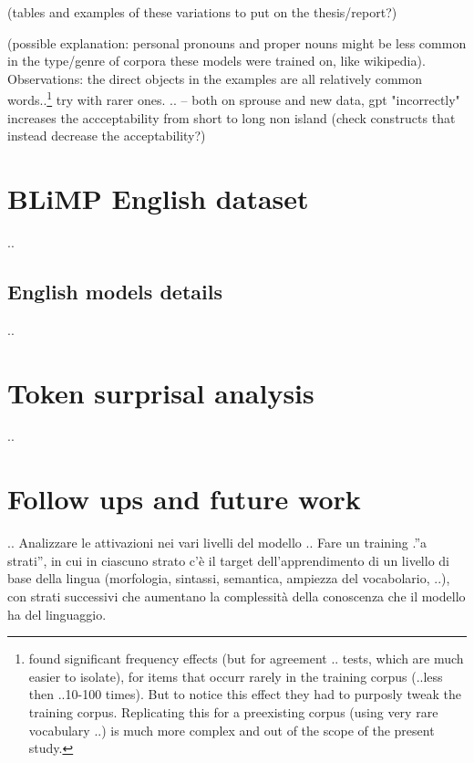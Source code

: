 (tables and examples of these variations to put on the thesis/report?)

(possible explanation: personal pronouns and proper nouns might be less common in the type/genre of corpora these models were trained on, like wikipedia).
Observations: the direct objects in the examples are all relatively common words..\footnote{\citet{wei2021frequency} found significant frequency effects (but for agreement .. tests, which are much easier to isolate), for items that occurr rarely in the training corpus (..less then ..10-100 times). But to notice this effect they had to purposly tweak the training corpus. Replicating this for a preexisting corpus (using very rare vocabulary ..) is much more complex and out of the scope of the present study.}
try with rarer ones.
..
-- both on sprouse and new data, gpt "incorrectly" increases the accceptability from short to long non island (check constructs that instead decrease the acceptability?)


\section{BLiMP English dataset}
..
\subsection{English models details}
..

\section{Token surprisal analysis}
..

\section{Follow ups and future work}





..
Analizzare le attivazioni nei vari livelli del modello ..
Fare un training .”a strati”, in cui in ciascuno strato c’è il target dell’apprendimento di un livello di base della lingua (morfologia, sintassi, semantica, ampiezza del vocabolario, ..), con strati successivi che aumentano la complessità della conoscenza che il modello ha del linguaggio.


